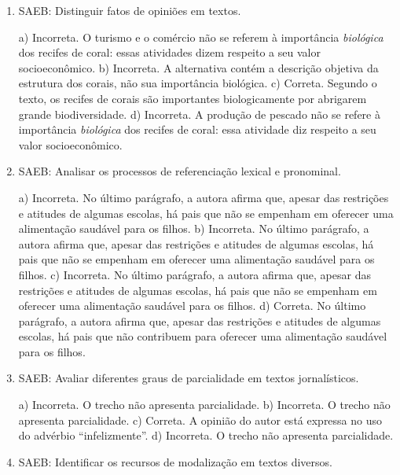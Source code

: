 \begin{enumerate}
	\item
SAEB: Distinguir fatos de opiniões em textos.

a) Incorreta. O turismo e o comércio não se referem à importância 
\textit{biológica} dos recifes de coral: essas atividades dizem respeito a
seu valor socioeconômico.
b) Incorreta. A alternativa contém a descrição objetiva da estrutura dos
corais, não sua importância biológica.
c) Correta. Segundo o texto, os recifes de corais são importantes
biologicamente por abrigarem grande biodiversidade.
d) Incorreta. A produção de pescado não se refere à importância 
\textit{biológica} dos recifes de coral: essa atividade diz respeito
a seu valor socioeconômico.

	\item
SAEB: Analisar os processos de referenciação lexical e pronominal.

a) Incorreta. No último parágrafo, a autora afirma que, apesar das restrições
e atitudes de algumas escolas, há pais que não se empenham em oferecer uma alimentação saudável para os filhos.
b) Incorreta. No último parágrafo, a autora afirma que, apesar das restrições
e atitudes de algumas escolas, há pais que não se empenham em oferecer uma alimentação saudável para os filhos.
c) Incorreta. No último parágrafo, a autora afirma que, apesar das restrições
e atitudes de algumas escolas, há pais que não se empenham em oferecer uma alimentação saudável para os filhos.
d) Correta. No último parágrafo, a autora afirma que, apesar das restrições
e atitudes de algumas escolas, há pais que não contribuem para oferecer uma alimentação saudável para os filhos.
	
	\item
SAEB: Avaliar diferentes graus de parcialidade em textos jornalísticos.

a) Incorreta. O trecho não apresenta parcialidade.
b) Incorreta. O trecho não apresenta parcialidade.
c) Correta. A opinião do autor está expressa no uso do advérbio ``infelizmente''.
d) Incorreta. O trecho não apresenta parcialidade.

	\item
SAEB: Identificar os recursos de modalização em textos diversos.


\end{enumerate}

